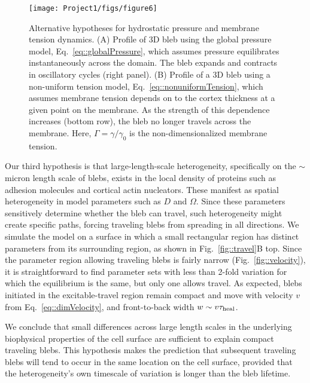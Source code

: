 \begin{figure}
   \begin{center}
   \captionsetup{width=17cm}
     \texttt{[image: Project1/figs/figure6]}
      \caption{Alternative hypotheses for hydrostatic pressure and membrane tension dynamics. (A) Profile of 3D bleb using the global pressure model, Eq.~\ref{eq::globalPressure}, which assumes pressure equilibrates instantaneously across the domain. The bleb expands and contracts in oscillatory cycles (right panel). (B) Profile  of a 3D bleb using a non-uniform tension model, Eq.~\ref{eq::nonuniformTension}, which assumes membrane tension depends on to the cortex thickness at a given point on the membrane. As the strength of this dependence increases (bottom row), the bleb no longer travels across the membrane. Here, $\Gamma = \gamma/\gamma_0$ is the non-dimensionalized membrane tension.}
      \label{fig::variants}
   \end{center}
\end{figure}

Our third hypothesis is that large-length-scale heterogeneity, specifically on the $\sim$ micron length scale of blebs, exists in the local density of proteins such as adhesion molecules and cortical actin nucleators. These manifest as spatial heterogeneity in model parameters such as $D$ and $\Omega$. Since these parameters sensitively determine whether the bleb can travel, such heterogeneity might create specific paths, forcing traveling blebs from spreading in all directions. We simulate the model on a surface in which a small rectangular region has distinct parameters from its surrounding region, as shown in Fig.~\ref{fig::travel}B top. Since the parameter region allowing traveling blebs is fairly narrow (Fig.~\ref{fig::velocity}), it is straightforward to find parameter sets with less than 2-fold variation for which the equilibrium is the same, but only one allows travel. As expected, blebs initiated in the excitable-travel region remain compact and move with velocity $v$ from Eq.~\ref{eq::dimVelocity}, and front-to-back width $w\sim v\tau_{\mbox{\scriptsize heal}}$. 

We conclude that small differences across large length scales in the underlying biophysical properties of the cell surface are sufficient to explain compact traveling blebs. This hypothesis makes the prediction that subsequent traveling blebs will tend to occur in the same location on the cell surface, provided that the heterogeneity's own timescale of variation is longer than the bleb lifetime. %


